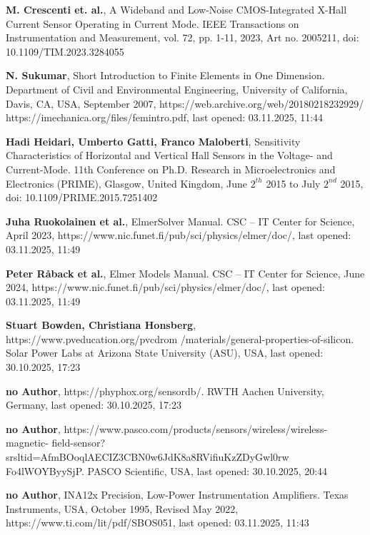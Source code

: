 \documentclass[12pt, a4paper]{article}
\begin{document}
\begin{thebibliography}{}
	\textbf{M. Crescenti et. al.}, A Wideband and Low-Noise CMOS-Integrated X-Hall Current Sensor Operating in Current Mode. IEEE Transactions on Instrumentation and Measurement, vol. 72, pp. 1-11, 2023, Art no. 2005211, doi: 10.1109/TIM.2023.3284055
	
	\textbf{N. Sukumar}, Short Introduction to Finite Elements in One Dimension. \newline Department of Civil and Environmental Engineering, University of California, \newline Davis, CA, USA, September 2007, https://web.archive.org/web/20180218232929/\newline
	https://imechanica.org/files/femintro.pdf, last opened: 03.11.2025, 11:44 
	
	\textbf{Hadi Heidari, Umberto Gatti, Franco Maloberti}, Sensitivity Characteristics of Horizontal and Vertical
	Hall Sensors in the Voltage- and Current-Mode. 11th Conference on Ph.D. Research in Microelectronics and Electronics (PRIME), Glasgow, United Kingdom, June $2^{th}$ 2015 to July $2^{nd}$ 2015, doi: 10.1109/PRIME.2015.7251402
	
	\textbf{Juha Ruokolainen et al.}, ElmerSolver Manual. CSC – IT Center for Science, April 2023, https://www.nic.funet.fi/pub/sci/physics/elmer/doc/, last opened: 03.11.2025, 11:49
	
	\textbf{Peter R\aa{back} et al.}, Elmer Models Manual. CSC – IT Center for Science, June 2024, https://www.nic.funet.fi/pub/sci/physics/elmer/doc/, last opened: 03.11.2025, 11:49
	
	\textbf{Stuart Bowden, Christiana Honsberg}, https://www.pveducation.org/pvcdrom /materials/general-properties-of-silicon. Solar Power Labs at Arizona State University (ASU), USA, last opened: 30.10.2025, 17:23
	
	\textbf{no Author}, https://phyphox.org/sensordb/. RWTH Aachen University, Germany, last opened: 30.10.2025, 17:23
	
	\textbf{no Author}, https://www.pasco.com/products/sensors/wireless/wireless-magnetic- field-sensor?srsltid=AfmBOoqlAECIZ3CBN0w6JdK8a8RVifiuKzZDyGwl0rw Fo4lWOYByySjP. PASCO Scientific, USA, last opened: 30.10.2025, 20:44
	
	\textbf{no Author}, INA12x Precision, Low-Power Instrumentation Amplifiers. Texas Instruments, USA, October 1995, Revised May 2022, https://www.ti.com/lit/pdf/SBOS051, last opened: 03.11.2025, 11:43
	

\end{thebibliography}
\end{document}
